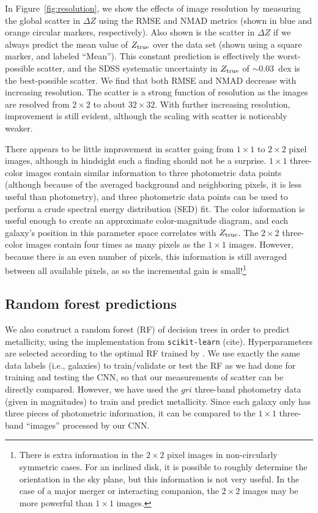\documentclass[fleqn,usenatbib]{mnras}
\begin{document}
In Figure~\ref{fig:resolution}, we show the effects of image resolution by measuring the global scatter in $\Delta Z$ using the RMSE and NMAD metrics (shown in blue and orange circular markers, respectively).
Also shown is the scatter in $\Delta Z$ if we always predict the mean value of $Z_{\rm true}$ over the data set (shown using a square marker, and labeled ``Mean'').
This constant prediction is effectively the worst-possible scatter, and the SDSS systematic uncertainty in $Z_{\rm true}$ of $\sim 0.03$~dex is the best-possible scatter.
We find that both RMSE and NMAD decrease with increasing resolution.
The scatter is a strong function of resolution as the images are resolved from $2 \times 2$ to about $32 \times 32$.
With further increasing resolution, improvement is still evident, although the scaling with scatter is noticeably weaker.


There appears to be little improvement in scatter going from $1 \times 1$ to $2\times 2$ pixel images, although in hindsight such a finding should not be a surprise.
$1\times 1$ three-color images contain similar information to three photometric data points (although because of the averaged background and neighboring pixels, it is less useful than photometry), and three photometric data points can be used to perform a crude spectral energy distribution (SED) fit.
The color information is useful enough to create an approximate color-magnitude diagram, and each galaxy's position in this parameter space correlates with $Z_{\rm true}$.
The $2 \times 2$ three-color images contain four times as many pixels as the $1\times 1$ images.
However, because there is an even number of pixels, this information is still averaged between all available pixels, as so the incremental gain is small!\footnote{There is extra information in the $2\times 2$ pixel images in non-circularly symmetric cases. For an inclined disk, it is possible to roughly determine the orientation in the sky plane, but this information is not very useful. In the case of a major merger or interacting companion, the $2\times 2$ images may be more powerful than $1 \times 1$ images.}

\subsection{Random forest predictions}
We also construct a random forest (RF) of decision trees in order to predict metallicity, using the implementation from \texttt{scikit-learn} (cite).
Hyperparameters are selected according to the optimal RF trained by \cite{2016MNRAS.456.1618A}.
We use exactly the same data labels (i.e., galaxies) to train/validate or test the RF as we had done for training and testing the CNN, so that our measurements of scatter can be directly compared.
However, we have used the $gri$ three-band photometry data (given in magnitudes) to train and predict metallicity.
Since each galaxy only has three pieces of photometric information, it can be compared to the $1 \times 1$ three-band ``images'' processed by our CNN.
\end{document}
